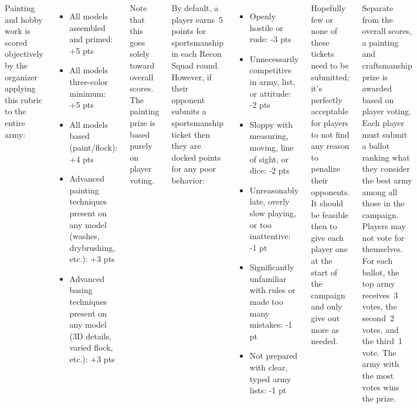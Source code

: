\begin{columns}

Painting and hobby work is scored objectively by the organizer
applying this rubric to the entire army:

\begin{itemize}\shortlist
\item All models assembled and primed: +5 pts
\item All models three-color minimum: +5 pts
\item All models based (paint/flock): +4 pts
\item Advanced painting techniques present on any model (washes,
  drybrushing, etc.): +3 pts
\item Advanced basing techniques present on any model (3D details,
  varied flock, etc.): +3 pts
\end{itemize}

Note that this goes solely toward overall scores.  The painting prize
is based purely on player voting.


By default, a player earns~5 points for sportsmanship in each Recon
Squad round.  However, if their opponent submits a sportsmanship
ticket then they are docked points for any poor behavior:

\begin{itemize}\shortlist
\item Openly hostile or rude: -3 pts
\item Unnecessarily competitive in army, list, or attitude: -2 pts
\item Sloppy with measuring, moving, line of sight, or dice: -2 pts
\item Unreasonably late, overly slow playing, or too inattentive: -1 pt
\item Significantly unfamiliar with rules or made too many mistakes:
  -1 pt
\item Not prepared with clear, typed army lists: -1 pt
\end{itemize}

Hopefully few or none of these tickets need to be submitted; it's
perfectly acceptable for players to not find any reason to penalize
their opponents.  It should be feasible then to give each player one
at the start of the campaign and only give out more as needed.

  Separate from the overall scores,
a painting and craftsmanship prize is awarded based on player voting.
Each player must submit a ballot ranking what they consider the best
army among all those in the campaign.  Players may not vote for
themselves.  For each ballot, the top army receives~3 votes, the
second~2 votes, and the third~1 vote.  The army with the most votes
wins the prize.

\end{columns}

\squelchbackground



\restorebackground
